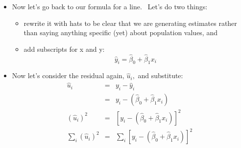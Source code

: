 \documentclass[11pt]{article}
\begin{document}
\begin{itemize}
\item Now let's go back to our formula for a line. \ Let's do two things:

\begin{itemize}
\item rewrite it with hats to be clear that we are generating estimates
rather than saying anything specific (yet) about population values, and

\item add subscripts for x and y:%
\begin{equation*}
\widehat{y}_{i}=\widehat{\beta }_{0}+\widehat{\beta }_{1}x_{i}
\end{equation*}
\end{itemize}

\item Now let's consider the residual again, $\widehat{u}_{i},$ and
substitute:%
\begin{eqnarray*}
\widehat{u}_{i} &=&y_{i}-\widehat{y}_{i} \\
&=&y_{i}-\left( \widehat{\beta }_{0}+\widehat{\beta }_{1}x_{i}\right) \\
\left( \widehat{u}_{i}\right) ^{2} &=&\left[ y_{i}-\left( \widehat{\beta }%
_{0}+\widehat{\beta }_{1}x_{i}\right) \right] ^{2} \\
\sum\nolimits_{i}\left( \widehat{u}_{i}\right) ^{2} &=&\sum\nolimits_{i}%
\left[ y_{i}-\left( \widehat{\beta }_{0}+\widehat{\beta }_{1}x_{i}\right) %
\right] ^{2}
\end{eqnarray*}


\end{itemize}
\end{document}
